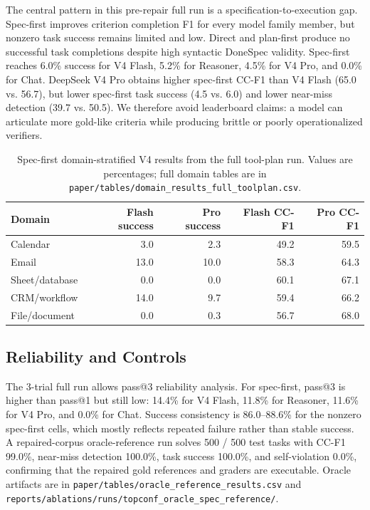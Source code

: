 The central pattern in this pre-repair full run is a specification-to-execution gap. Spec-first improves criterion completion F1 for every model family member, but nonzero task success remains limited and low. Direct and plan-first produce no successful task completions despite high syntactic DoneSpec validity. Spec-first reaches 6.0\% success for V4 Flash, 5.2\% for Reasoner, 4.5\% for V4 Pro, and 0.0\% for Chat. DeepSeek V4 Pro obtains higher spec-first CC-F1 than V4 Flash (65.0 vs. 56.7), but lower spec-first task success (4.5 vs. 6.0) and lower near-miss detection (39.7 vs. 50.5). We therefore avoid leaderboard claims: a model can articulate more gold-like criteria while producing brittle or poorly operationalized verifiers.

\begin{table}[tbp]
\centering
\small
\begin{tabular}{lrrrr}
\toprule
Domain & Flash success & Pro success & Flash CC-F1 & Pro CC-F1 \\
\midrule
Calendar & 3.0 & 2.3 & 49.2 & 59.5 \\
Email & 13.0 & 10.0 & 58.3 & 64.3 \\
Sheet/database & 0.0 & 0.0 & 60.1 & 67.1 \\
CRM/workflow & 14.0 & 9.7 & 59.4 & 66.2 \\
File/document & 0.0 & 0.3 & 56.7 & 68.0 \\
\bottomrule
\end{tabular}
\caption{Spec-first domain-stratified V4 results from the full tool-plan run. Values are percentages; full domain tables are in \texttt{paper/tables/domain\_results\_full\_toolplan.csv}.}
\end{table}

\subsection{Reliability and Controls}

The 3-trial full run allows pass@3 reliability analysis. For spec-first, pass@3 is higher than pass@1 but still low: 14.4\% for V4 Flash, 11.8\% for Reasoner, 11.6\% for V4 Pro, and 0.0\% for Chat. Success consistency is 86.0--88.6\% for the nonzero spec-first cells, which mostly reflects repeated failure rather than stable success. A repaired-corpus oracle-reference run solves 500 / 500 test tasks with CC-F1 99.0\%, near-miss detection 100.0\%, task success 100.0\%, and self-violation 0.0\%, confirming that the repaired gold references and graders are executable. Oracle artifacts are in \texttt{paper/tables/oracle\_reference\_results.csv} and \texttt{reports/ablations/runs/topconf\_oracle\_spec\_reference/}.


